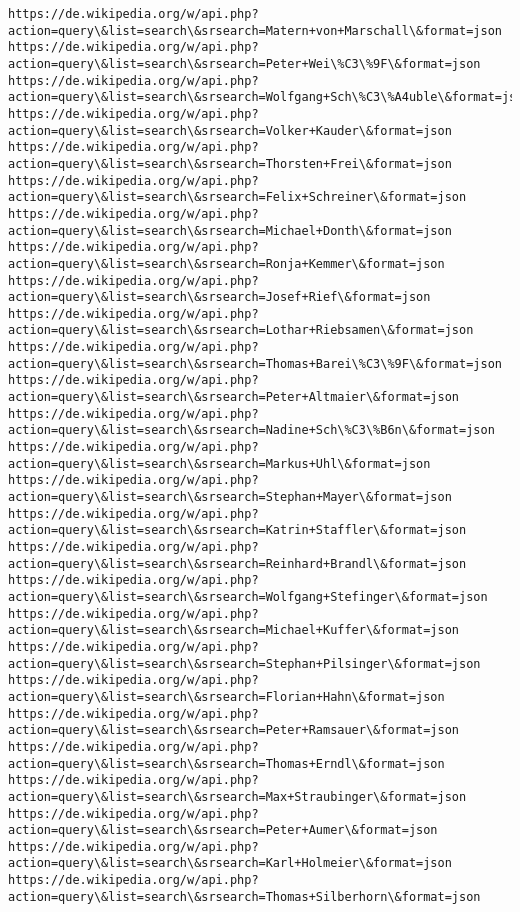 \documentclass[11pt]{article}
\begin{document}
\begin{Verbatim}[commandchars=\\\{\}]
https://de.wikipedia.org/w/api.php?action=query\&list=search\&srsearch=Matern+von+Marschall\&format=json
https://de.wikipedia.org/w/api.php?action=query\&list=search\&srsearch=Peter+Wei\%C3\%9F\&format=json
https://de.wikipedia.org/w/api.php?action=query\&list=search\&srsearch=Wolfgang+Sch\%C3\%A4uble\&format=json
https://de.wikipedia.org/w/api.php?action=query\&list=search\&srsearch=Volker+Kauder\&format=json
https://de.wikipedia.org/w/api.php?action=query\&list=search\&srsearch=Thorsten+Frei\&format=json
https://de.wikipedia.org/w/api.php?action=query\&list=search\&srsearch=Felix+Schreiner\&format=json
https://de.wikipedia.org/w/api.php?action=query\&list=search\&srsearch=Michael+Donth\&format=json
https://de.wikipedia.org/w/api.php?action=query\&list=search\&srsearch=Ronja+Kemmer\&format=json
https://de.wikipedia.org/w/api.php?action=query\&list=search\&srsearch=Josef+Rief\&format=json
https://de.wikipedia.org/w/api.php?action=query\&list=search\&srsearch=Lothar+Riebsamen\&format=json
https://de.wikipedia.org/w/api.php?action=query\&list=search\&srsearch=Thomas+Barei\%C3\%9F\&format=json
https://de.wikipedia.org/w/api.php?action=query\&list=search\&srsearch=Peter+Altmaier\&format=json
https://de.wikipedia.org/w/api.php?action=query\&list=search\&srsearch=Nadine+Sch\%C3\%B6n\&format=json
https://de.wikipedia.org/w/api.php?action=query\&list=search\&srsearch=Markus+Uhl\&format=json
https://de.wikipedia.org/w/api.php?action=query\&list=search\&srsearch=Stephan+Mayer\&format=json
https://de.wikipedia.org/w/api.php?action=query\&list=search\&srsearch=Katrin+Staffler\&format=json
https://de.wikipedia.org/w/api.php?action=query\&list=search\&srsearch=Reinhard+Brandl\&format=json
https://de.wikipedia.org/w/api.php?action=query\&list=search\&srsearch=Wolfgang+Stefinger\&format=json
https://de.wikipedia.org/w/api.php?action=query\&list=search\&srsearch=Michael+Kuffer\&format=json
https://de.wikipedia.org/w/api.php?action=query\&list=search\&srsearch=Stephan+Pilsinger\&format=json
https://de.wikipedia.org/w/api.php?action=query\&list=search\&srsearch=Florian+Hahn\&format=json
https://de.wikipedia.org/w/api.php?action=query\&list=search\&srsearch=Peter+Ramsauer\&format=json
https://de.wikipedia.org/w/api.php?action=query\&list=search\&srsearch=Thomas+Erndl\&format=json
https://de.wikipedia.org/w/api.php?action=query\&list=search\&srsearch=Max+Straubinger\&format=json
https://de.wikipedia.org/w/api.php?action=query\&list=search\&srsearch=Peter+Aumer\&format=json
https://de.wikipedia.org/w/api.php?action=query\&list=search\&srsearch=Karl+Holmeier\&format=json
https://de.wikipedia.org/w/api.php?action=query\&list=search\&srsearch=Thomas+Silberhorn\&format=json

\end{Verbatim}
\end{document}
